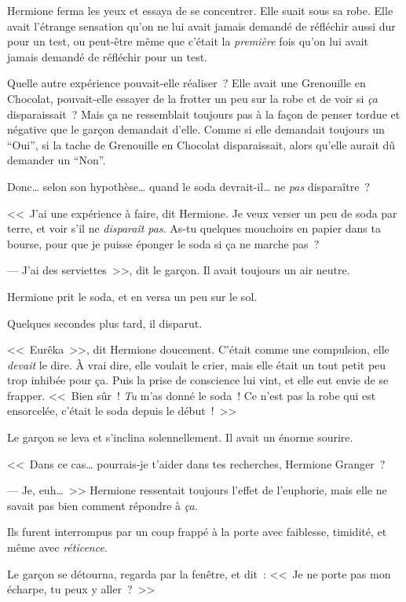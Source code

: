 Hermione ferma les yeux et essaya de se concentrer. Elle suait sous sa robe. Elle avait l'étrange sensation qu'on ne lui avait jamais demandé de réfléchir aussi dur pour un test, ou peut-être même que c'était la \emph{première} fois qu'on lui avait jamais demandé de réfléchir pour un test.

Quelle autre expérience pouvait-elle réaliser~? Elle avait une Grenouille en Chocolat, pouvait-elle essayer de la frotter un peu sur la robe et de voir si \emph{ça} disparaissait~? Mais ça ne ressemblait toujours pas à la façon de penser tordue et négative que le garçon demandait d'elle. Comme si elle demandait toujours un “Oui”, si la tache de Grenouille en Chocolat disparaissait, alors qu'elle aurait dû demander un “Non”.

Donc… selon son hypothèse… quand le soda devrait-il… ne \emph{pas} disparaître~?

<<~J'ai une expérience à faire, dit Hermione. Je veux verser un peu de soda par terre, et voir s'il ne \emph{disparaît pas}. As-tu quelques mouchoirs en papier dans ta bourse, pour que je puisse éponger le soda si ça ne marche pas~?

--- J'ai des serviettes~>>, dit le garçon. Il avait toujours un air neutre.

Hermione prit le soda, et en versa un peu sur le sol.

Quelques secondes plus tard, il disparut.

<<~Eurêka~>>, dit Hermione doucement. C'était comme une compulsion, elle \emph{devait} le dire. À vrai dire, elle voulait le crier, mais elle était un tout petit peu trop inhibée pour ça. Puis la prise de conscience lui vint, et elle eut envie de se frapper. <<~Bien sûr~! \emph{Tu} m'as donné le soda~! Ce n'est pas la robe qui est ensorcelée, c'était le soda depuis le début~!~>>

Le garçon se leva et s'inclina solennellement. Il avait un énorme sourire.

<<~Dans ce cas… pourrais-je t'aider dans tes recherches, Hermione Granger~?

--- Je, euh…~>> Hermione ressentait toujours l'effet de l'euphorie, mais elle ne savait pas bien comment répondre à \emph{ça}.

Ils furent interrompus par un coup frappé à la porte avec faiblesse, timidité, et même avec \emph{réticence}.

Le garçon se détourna, regarda par la fenêtre, et dit~: <<~Je ne porte pas mon écharpe, tu peux y aller~?~>>

